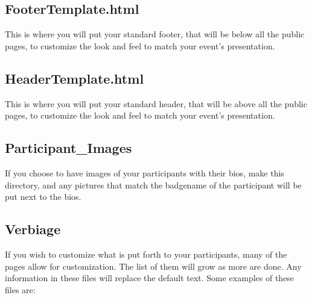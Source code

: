 \documentclass[captions=tablesignature]{scrartcl}
\begin{document}
\subsection{FooterTemplate.html}
\label{sec-3-2}
This is where you will put your standard footer, that will be
below all the public pages, to customize the look and feel to
match your event's presentation.

\subsection{HeaderTemplate.html}
\label{sec-3-3}
This is where you will put your standard header, that will be
above all the public pages, to customize the look and feel to
match your event's presentation.

\subsection{Participant\_Images}
\label{sec-3-4}
If you choose to have images of your participants with their
bios, make this directory, and any pictures that match the
badgename of the participant will be put next to the bios.

\subsection{Verbiage}
\label{sec-3-5}
If you wish to customize what is put forth to your participants,
many of the pages allow for customization.  The list of them will
grow as more are done.  Any information in these files will
replace the default text.  Some examples of these files are:
\end{document}
